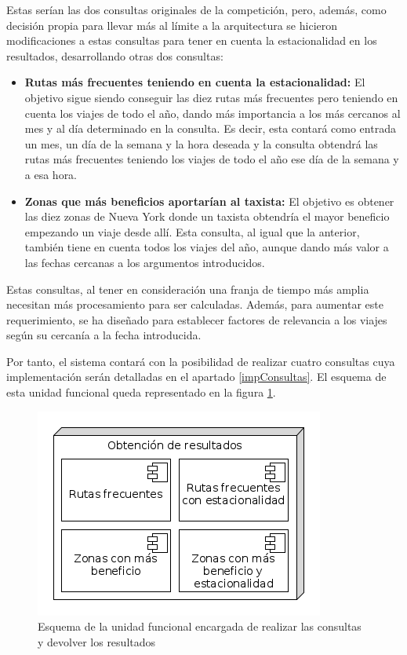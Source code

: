 Estas serían las dos consultas originales de la competición, pero, además, como decisión propia para llevar más al límite a la arquitectura se hicieron modificaciones a estas consultas para tener en cuenta la estacionalidad en los resultados, desarrollando otras dos consultas:

\begin{itemize}
\item \textbf{Rutas más frecuentes teniendo en cuenta la estacionalidad:} El objetivo sigue siendo conseguir las diez rutas más frecuentes pero teniendo en cuenta los viajes de todo el año, dando más importancia a los más cercanos al mes y al día determinado en la consulta. Es decir, esta contará como entrada un mes, un día de la semana y la hora deseada y la consulta obtendrá las rutas más frecuentes teniendo los viajes de todo el año ese día de la semana y a esa hora.

\item \textbf{Zonas que más beneficios aportarían al taxista:} El objetivo es obtener las diez zonas de Nueva York donde un taxista obtendría el mayor beneficio empezando un viaje desde allí. Esta consulta, al igual que la anterior, también tiene en cuenta todos los viajes del año, aunque dando más valor a las fechas cercanas a los argumentos introducidos.
\end{itemize}

Estas consultas, al tener en consideración una franja de tiempo más amplia necesitan más procesamiento para ser calculadas. Además, para aumentar este requerimiento, se ha diseñado para establecer factores de relevancia a los viajes según su cercanía a la fecha introducida.

Por tanto, el sistema contará con la posibilidad de realizar cuatro consultas cuya implementación serán detalladas en el apartado \ref{impConsultas}. El esquema de esta unidad funcional queda representado en la figura \ref{fig:consultas}. 

\begin{figure}[htp!]
\centering
\caption{Esquema de la unidad funcional encargada de realizar las consultas y devolver los resultados}
\label{fig:consultas}
\includegraphics[scale=0.7]{diagramas/obtResultados}
\end{figure}

